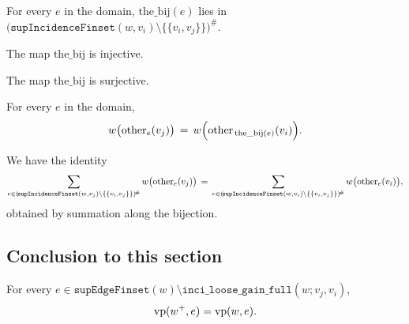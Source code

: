 \begin{lemma}\label{lem:the-bij-maps}
For every $e$ in the domain, $\mathrm{the\_bij}(e)$ lies in
$\bigl(\!\texttt{supIncidenceFinset}(w,v_i)\setminus\{\{v_i,v_j\}\}\bigr)^{\!\#}$.
\end{lemma}

\begin{lemma}[Injectivity]\label{lem:the-bij-inj}
The map $\mathrm{the\_bij}$ is injective.
\end{lemma}

\begin{lemma}[Surjectivity]\label{lem:the-bij-surj}
The map $\mathrm{the\_bij}$ is surjective.
\end{lemma}

\begin{lemma}\label{lem:the-bij-same}
For every $e$ in the domain,
\[
  w\bigl(\operatorname{other}_e(v_j)\bigr)
  \,=\,
  w\Bigl(\operatorname{other}_{\,\mathrm{the\_bij}(e)}(v_i)\Bigr).
\]
\end{lemma}

\begin{lemma}\label{lem:enhance-sum-loose-gain-equal}
We have the identity
\[
  \sum_{e\in(\!\texttt{supIncidenceFinset}(w,v_j)\setminus\{\{v_i,v_j\}\})^{\!\#}}
    w\bigl(\operatorname{other}_e(v_j)\bigr)
  \,=\,
  \sum_{e\in(\!\texttt{supIncidenceFinset}(w,v_i)\setminus\{\{v_i,v_j\}\})^{\!\#}}
    w\bigl(\operatorname{other}_e(v_i)\bigr),
\]
obtained by summation along the bijection.
\end{lemma}

\subsection{Conclusion to this section}

\begin{lemma}\label{lem:enhance-vp-complement-unchanged}
For every
\(e\in \texttt{supEdgeFinset}(w)\setminus \texttt{inci\_loose\_gain\_full}(w;v_j,v_i)\),
\[
  \operatorname{vp}(w^+,e)=\operatorname{vp}(w,e).
\]
\leanok
\end{lemma}

